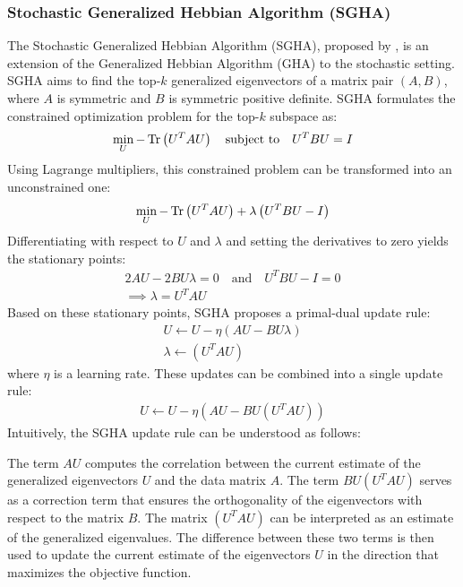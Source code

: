 \subsubsection{Stochastic Generalized Hebbian Algorithm (SGHA)}
The Stochastic Generalized Hebbian Algorithm (SGHA), proposed by \citet{chen2019constrained}, is an extension of the Generalized Hebbian Algorithm (GHA) to the stochastic setting. SGHA aims to find the top-$k$ generalized eigenvectors of a matrix pair $(A, B)$, where $A$ is symmetric and $B$ is symmetric positive definite.
SGHA formulates the constrained optimization problem for the top-$k$ subspace as:
\begin{align}
\min_{U} -\operatorname{Tr} \left(U^T A U\right) \quad \text{subject to} \quad U^T B U = I
\end{align}
Using Lagrange multipliers, this constrained problem can be transformed into an unconstrained one:
\begin{align}
\min_{U} -\operatorname{Tr}\left(U^T A U \right) + \lambda \left(U^T B U - I\right)
\end{align}
Differentiating with respect to $U$ and $\lambda$ and setting the derivatives to zero yields the stationary points:
\begin{align}
2 A U - 2 B U \lambda = 0 \quad \text{and} \quad U^T B U - I = 0 \\
\implies \lambda = U^T A U
\end{align}
Based on these stationary points, SGHA proposes a primal-dual update rule:
\begin{align}
U \leftarrow U - \eta \left( A U - B U \lambda \right) \\
\lambda \leftarrow \left( U^T A U \right)
\end{align}
where $\eta$ is a learning rate.
These updates can be combined into a single update rule:
\begin{align}
U \leftarrow U - \eta \left( A U - B U \left( U^T A U \right) \right)
\end{align}
Intuitively, the SGHA update rule can be understood as follows:

The term $A U$ computes the correlation between the current estimate of the generalized eigenvectors $U$ and the data matrix $A$.
The term $B U \left( U^T A U \right)$ serves as a correction term that ensures the orthogonality of the eigenvectors with respect to the matrix $B$. The matrix $\left( U^T A U \right)$ can be interpreted as an estimate of the generalized eigenvalues.
The difference between these two terms is then used to update the current estimate of the eigenvectors $U$ in the direction that maximizes the objective function.

